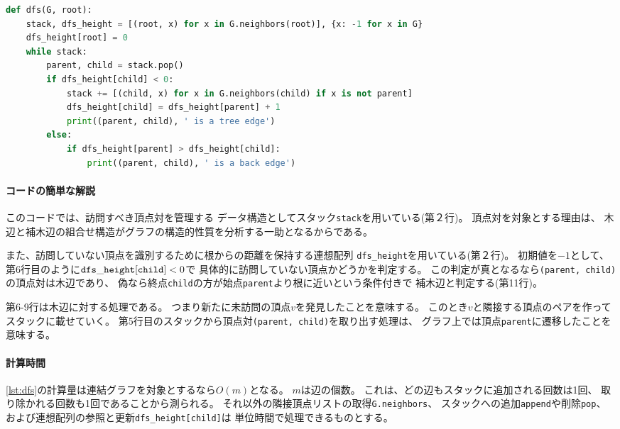 \begin{lstlisting}[language=Python, caption=深さ優先探索の基本形,label=lst:dfs]
def dfs(G, root):
    stack, dfs_height = [(root, x) for x in G.neighbors(root)], {x: -1 for x in G}
    dfs_height[root] = 0
    while stack:
        parent, child = stack.pop()
        if dfs_height[child] < 0:
            stack += [(child, x) for x in G.neighbors(child) if x is not parent]
            dfs_height[child] = dfs_height[parent] + 1
            print((parent, child), ' is a tree edge')
        else:
            if dfs_height[parent] > dfs_height[child]:
                print((parent, child), ' is a back edge')
\end{lstlisting}%
%
\paragraph{コードの簡単な解説}
このコードでは、訪問すべき頂点対を管理する
データ構造としてスタック{\tt stack}を用いている(第２行)。
頂点対を対象とする理由は、
木辺と補木辺の組合せ構造がグラフの構造的性質を分析する一助となるからである。


また、訪問していない頂点を識別するために根からの距離を保持する連想配列
{\tt dfs\_height}を用いている(第２行)。
初期値を$-1$として、第6行目のように${\tt dfs\_height[child]} < 0$で
具体的に訪問していない頂点かどうかを判定する。
この判定が真となるなら{\tt (parent, child)}の頂点対は木辺であり、
偽なら終点{\tt child}の方が始点{\tt parent}より根に近いという条件付きで
補木辺と判定する(第11行)。

第6-9行は木辺に対する処理である。
つまり新たに未訪問の頂点$v$を発見したことを意味する。
このとき$v$と隣接する頂点のペアを作ってスタックに載せていく。
第5行目のスタックから頂点対{\tt (parent, child)}を取り出す処理は、
グラフ上では頂点{\tt parent}に遷移したことを意味する。

\paragraph{計算時間}
\lstrefname\ref{lst:dfs}の計算量は連結グラフを対象とするなら$O(m)$となる。
$m$は辺の個数。
これは、どの辺もスタックに追加される回数は1回、
取り除かれる回数も1回であることから測られる。
それ以外の隣接頂点リストの取得{\tt G.neighbors}、
スタックへの追加{\tt append}や削除{\tt pop}、
および連想配列の参照と更新{\tt dfs\_height[child]}は
単位時間で処理できるものとする。




